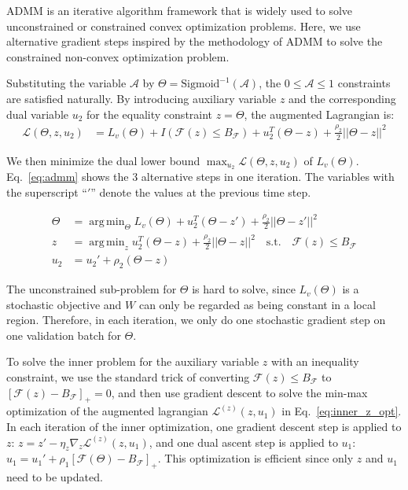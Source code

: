 \documentclass[runningheads]{llncs}
\newcommand{\flops}{\mathcal{F}}
\DeclareMathOperator*{\argmin}{arg\,min}
\newcommand{\alphas}{\mathcal{A}}
\newcommand{\invas}{\Theta}
\newcommand{\lag}{\mathcal{L}}
\begin{document}
  
  ADMM is an iterative algorithm framework that is widely used to solve unconstrained or constrained convex optimization problems. Here,
  we use alternative gradient steps inspired by the methodology of ADMM to solve the constrained non-convex optimization problem.
  
  
  
  Substituting the variable $\alphas$ by $\invas = \mbox{Sigmoid}^{-1}(\alphas)$,
  the $0 \leq \alphas \leq 1$ constraints are satisfied naturally. 
  By introducing auxiliary variable $z$ and the corresponding dual variable $u_2$ for the equality constraint $z = \invas$, the augmented Lagrangian is:
  \begin{equation}
      \begin{aligned}
      \lag(\invas, z, u_2) &= L_v(\invas) + I(\flops(z) \leq B_\flops) + u_2^T (\invas - z) + \frac{\rho_2}{2} ||\invas - z||^2
      \end{aligned}
  \end{equation}
  
  We then minimize the dual lower bound $\max_{u_2} \lag(\invas, z, u_2)$ of $L_v(\invas)$.
  Eq.~\ref{eq:admm} shows the 3 alternative steps in one iteration. 
  The variables with the superscript ``$'$'' denote the values at the previous time step.
  
  \begin{equation}
      \begin{aligned}
      \invas &= \argmin_\invas L_v(\invas) +  u_2^T (\invas - z') + \frac{\rho_2}{2} ||\invas - z'||^2\\
      z &= \argmin_z u_2^T (\invas - z) + \frac{\rho_2}{2} ||\invas - z||^2 \quad\mbox{s.t.} \quad \flops(z) \leq B_\flops\\
      u_2 &= u_2' + \rho_2 (\invas - z)
      \end{aligned}
  \label{eq:admm}
  \end{equation}
  
  
  The unconstrained sub-problem for $\invas$ is hard to solve, since $L_v(\invas)$ is a stochastic objective and $W$ can only be regarded as being constant in a local region. Therefore, in each iteration, we only do one stochastic gradient step on one validation batch for $\invas$. 
  
  To solve the inner problem for the auxiliary variable $z$ with an inequality constraint, we use the standard trick of converting $\flops(z) \leq B_\flops$ to $[\flops(z) - B_\flops]_+ = 0$, and then use gradient descent to solve the min-max optimization of the augmented lagrangian $\lag^{(z)}(z, u_1)$ in Eq.~\ref{eq:inner_z_opt}. In each iteration of the inner optimization, one gradient descent step is applied to $z$: $z = z' - \eta_z \nabla_z\lag^{(z)}(z, u_1)$, and one dual ascent step is applied to $u_1$: $u_1 = u_1' + \rho_1 [\flops(\invas) - B_\flops]_+$. This optimization is efficient since only $z$ and $u_1$ need to be updated.
  
\end{document}
